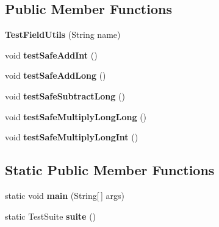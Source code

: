 \subsection*{Public Member Functions}
\begin{DoxyCompactItemize}
\item 
\hypertarget{classorg_1_1joda_1_1time_1_1field_1_1_test_field_utils_a01add3eaf1da2644b780163bac847c75}{{\bfseries Test\-Field\-Utils} (String name)}\label{classorg_1_1joda_1_1time_1_1field_1_1_test_field_utils_a01add3eaf1da2644b780163bac847c75}

\item 
\hypertarget{classorg_1_1joda_1_1time_1_1field_1_1_test_field_utils_a3a17d557db8cfe7aca7e545d71b6cdc9}{void {\bfseries test\-Safe\-Add\-Int} ()}\label{classorg_1_1joda_1_1time_1_1field_1_1_test_field_utils_a3a17d557db8cfe7aca7e545d71b6cdc9}

\item 
\hypertarget{classorg_1_1joda_1_1time_1_1field_1_1_test_field_utils_abe06017cda9dfa9e6109aa23d0dfb260}{void {\bfseries test\-Safe\-Add\-Long} ()}\label{classorg_1_1joda_1_1time_1_1field_1_1_test_field_utils_abe06017cda9dfa9e6109aa23d0dfb260}

\item 
\hypertarget{classorg_1_1joda_1_1time_1_1field_1_1_test_field_utils_a6aa31692281ccadb380e919a1a6e5a94}{void {\bfseries test\-Safe\-Subtract\-Long} ()}\label{classorg_1_1joda_1_1time_1_1field_1_1_test_field_utils_a6aa31692281ccadb380e919a1a6e5a94}

\item 
\hypertarget{classorg_1_1joda_1_1time_1_1field_1_1_test_field_utils_a78ab3c0ef3a03f835fcb650263a09004}{void {\bfseries test\-Safe\-Multiply\-Long\-Long} ()}\label{classorg_1_1joda_1_1time_1_1field_1_1_test_field_utils_a78ab3c0ef3a03f835fcb650263a09004}

\item 
\hypertarget{classorg_1_1joda_1_1time_1_1field_1_1_test_field_utils_ac0164e1d472568f40b18e7974985429d}{void {\bfseries test\-Safe\-Multiply\-Long\-Int} ()}\label{classorg_1_1joda_1_1time_1_1field_1_1_test_field_utils_ac0164e1d472568f40b18e7974985429d}

\end{DoxyCompactItemize}
\subsection*{Static Public Member Functions}
\begin{DoxyCompactItemize}
\item 
\hypertarget{classorg_1_1joda_1_1time_1_1field_1_1_test_field_utils_acf28a2d248a09f6f7872a818b560d996}{static void {\bfseries main} (String\mbox{[}$\,$\mbox{]} args)}\label{classorg_1_1joda_1_1time_1_1field_1_1_test_field_utils_acf28a2d248a09f6f7872a818b560d996}

\item 
\hypertarget{classorg_1_1joda_1_1time_1_1field_1_1_test_field_utils_ac380efe7dd81d7db117c1c5b741a97f8}{static Test\-Suite {\bfseries suite} ()}\label{classorg_1_1joda_1_1time_1_1field_1_1_test_field_utils_ac380efe7dd81d7db117c1c5b741a97f8}

\end{DoxyCompactItemize}


